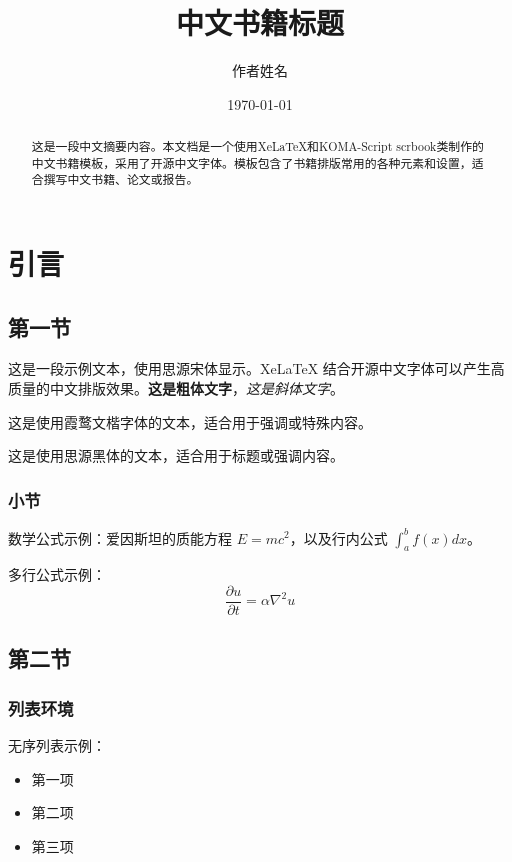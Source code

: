 \documentclass[fontsize=12pt, paper=a4, twoside, openright, DIV=calc]{scrbook}
\title{中文书籍标题}
\author{作者姓名}
\date{\today}
\theoremstyle{break}
\begin{document}
\maketitle

\frontmatter

\begin{abstract}
这是一段中文摘要内容。本文档是一个使用XeLaTeX和KOMA-Script scrbook类制作的中文书籍模板，采用了开源中文字体。模板包含了书籍排版常用的各种元素和设置，适合撰写中文书籍、论文或报告。
\end{abstract}

\tableofcontents

\mainmatter

\chapter{引言}

\section{第一节}

这是一段示例文本，使用思源宋体显示。XeLaTeX 结合开源中文字体可以产生高质量的中文排版效果。\textbf{这是粗体文字}，\textit{这是斜体文字}。

{\kai 这是使用霞鹜文楷字体的文本，适合用于强调或特殊内容。}

{\hei 这是使用思源黑体的文本，适合用于标题或强调内容。}

\subsection{小节}

数学公式示例：爱因斯坦的质能方程 $E = mc^2$，以及行内公式 $\int_a^b f(x) dx$。

多行公式示例：
\begin{equation}
\frac{\partial u}{\partial t} = \alpha \nabla^2 u
\end{equation}

\section{第二节}

\subsection{列表环境}

无序列表示例：
\begin{itemize}
\item 第一项
\item 第二项
\item 第三项
\end{itemize}
\end{document}
